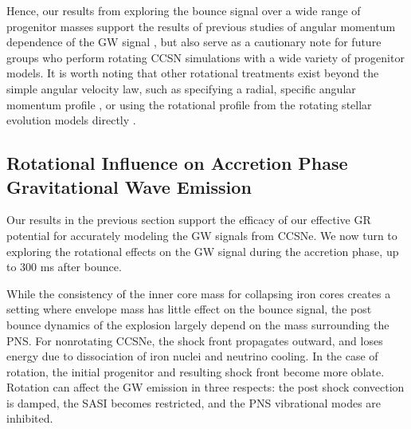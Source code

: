 \documentclass[twocolumn,times]{aastex62}  %
\begin{document}
Hence, our results from exploring the bounce signal over a wide range of progenitor masses support the results of previous studies of angular momentum dependence of the GW signal \citep{dimm:2008,abdik:2010,abdik:2014}, but also serve as a cautionary note for future groups who perform rotating CCSN simulations with a wide variety of progenitor models.  
It is worth noting that other rotational treatments exist beyond the simple angular velocity law, such as specifying a radial, specific angular momentum profile \citep[eg.][]{oconnor:2011}, or using the rotational profile from the rotating stellar evolution models directly \citep{summa:2018}.

\subsection{Rotational Influence on Accretion Phase Gravitational Wave Emission}

Our results in the previous section support the efficacy of our effective GR potential for accurately modeling the GW signals from CCSNe.
We now turn to exploring the rotational effects on the GW signal during the accretion phase, up to 300 ms after bounce.


While the consistency of the inner core mass for collapsing iron cores creates a setting where envelope mass has little effect on the bounce signal, the post bounce dynamics of the explosion largely depend on the mass surrounding the PNS.  For nonrotating CCSNe, the shock front propagates outward, and loses energy due to dissociation of iron nuclei and neutrino cooling.  In the case of rotation, the initial progenitor and resulting shock front become more oblate.  Rotation can affect the GW emission in three respects: the post shock convection is damped, the SASI becomes restricted, and the PNS vibrational modes are inhibited. 
\end{document}
